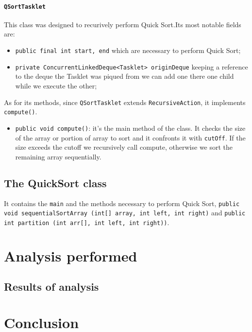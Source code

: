 \documentclass[twocolumn]{article}
\def\code#1{\texttt{#1}}
\begin{document}
	\paragraph{\code{QSortTasklet}} This class was designed to recurively perform Quick Sort.Its most notable fields are:
	\begin{itemize}
		\item \code{public final int start, end} which are necessary to perform Quick Sort; 
		\item \code{private ConcurrentLinkedDeque<Tasklet> originDeque} keeping a reference to the deque the Tasklet was piqued from we can add one there one child while we execute the other;
	\end{itemize}
	
	As for its methods, since \code{QSortTasklet} extends \code{RecursiveAction}, it implements \code{compute()}.
	\begin{itemize}
		\item \code{public void compute()}: it's the main method of the class. It checks the size of the array or portion of array to sort and it confronts it with \code{cutOff}. If the size exceeds the cutoff we recursively call compute, otherwise we sort the remaining array sequentially. 
	\end{itemize}
	
	\subsection{The QuickSort class}
	It contains the \code{main} and the methods necessary to perform Quick Sort, \code{public void sequentialSortArray (int[] array, int left, int right)} and \code{public int partition (int arr[], int left, int right))}.
	
	\section{Analysis performed}\label{analysis}
	\subsection{Results of analysis}
	
	\section{Conclusion}	
		
\end{document}
